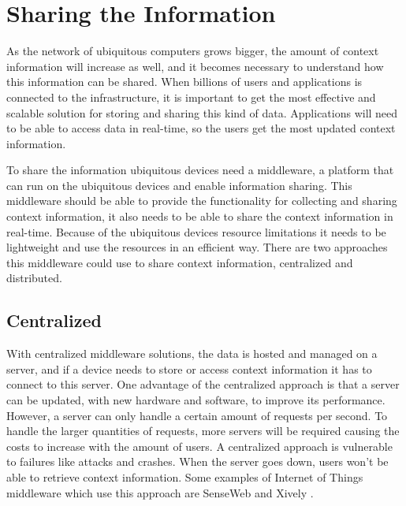 \section{Sharing the Information}
As the network of ubiquitous computers grows bigger, the amount of context information will increase as well, and it becomes necessary to understand how this information can be shared. When billions of users and applications is connected to the infrastructure, it is important to get the most effective and scalable solution for storing and sharing this kind of data. Applications will need to be able to access data in real-time, so the users get the most updated context information. 

To share the information ubiquitous devices need a middleware, a platform that can run on the ubiquitous devices and enable information sharing. This middleware should be able to provide the functionality for collecting and sharing context information, it also needs to be able to share the context information in real-time. Because of the ubiquitous devices resource limitations it needs to be lightweight and use the resources in an efficient way. There are two approaches this middleware could use to share context information, centralized and distributed.

\subsection{Centralized}
With centralized middleware solutions, the data is hosted and managed on a server, and if a device needs to store or access context information it has to connect to this server. One advantage of the centralized approach is that a server can be updated, with new hardware and software, to improve its performance. 
However, a server can only handle a certain amount of requests per second. To handle the larger quantities of requests, more servers will be required causing the costs to increase with the amount of users. A centralized approach is vulnerable to failures like attacks and crashes. When the server goes down, users won't be able to retrieve context information. Some examples of Internet of Things middleware which use this approach are SenseWeb \cite{senseweb} and Xively \cite{xively}.


